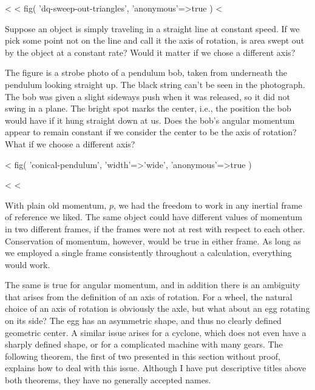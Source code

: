 \startdqs

<%
<%
  fig(
    'dq-sweep-out-triangles',
    {
      'anonymous'=>true
    }
  )
<%
\begin{dq}\label{dq:sweep-out-triangles}
Suppose an object is simply traveling in a straight line
at constant speed. If we pick some point not on the line and
call it the axis of rotation, is area swept out by the
object at a constant rate? Would it matter if we chose a different axis?
\end{dq}

\begin{dq}\label{dq:conical-pendulum}
The figure is a strobe photo of a pendulum bob,
taken from underneath the pendulum looking straight up. The
black string can't be seen in the photograph. The bob was
given a slight sideways push when it was released, so it did
not swing in a plane. The bright spot marks the center, i.e.,
the position the bob would have if it hung straight down at
us. Does the bob's angular momentum appear to remain
constant if we consider the center to be the axis of
rotation? What if we choose a different axis?
\end{dq}

<%
  fig(
    'conical-pendulum',
    {
      'width'=>'wide',
      'anonymous'=>true
    }
  )

<%
<%

With plain old momentum, $p$, we had the freedom to work in
any inertial frame of reference we liked. The same object
could have different values of momentum in two different
frames, if the frames were not at rest with respect to each
other. Conservation of momentum, however, would be true in
either frame. As long as we employed a single frame
consistently throughout a calculation, everything would work.

The same is true for angular momentum, and in addition there
is an ambiguity that arises from the definition of an axis
of rotation. For a wheel, the natural choice of an axis of
rotation is obviously the axle, but what about an egg
rotating on its side? The egg has an asymmetric shape, and
thus no clearly defined geometric center. A similar issue
arises for a cyclone, which does not even have a sharply
defined shape, or for a complicated machine with many gears.
The following theorem, the first of two presented in this
section without proof, explains how to deal with this issue.
Although I have put descriptive titles above both theorems,
they have no generally accepted names.

